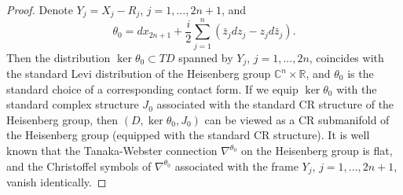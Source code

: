 \documentclass{article}
\newcommand{\CC}{\mathbb C}
\newcommand{\RR}{\mathbb R}
\begin{document}
\begin{proof}
%
Denote $Y_j = X_j - R_j$, $j = 1,...,2n+1$, and $$\theta_0 = dx_{2n+1} + \frac i 2 \sum_{j=1}^n (\bar z_j dz_j - z_j d \bar z_j).$$ Then the distribution $\ker \theta_0 \subset TD$ spanned by $Y_j$, $j = 1,...,2n$, coincides with the standard Levi distribution of the Heisenberg group $\CC^n \times \RR$, and $\theta_0$ is the standard choice of a corresponding contact form. If we equip $\ker \theta_0$ with the standard complex structure $J_{0}$ associated with the standard CR structure of the Heisenberg group, then $(D, \ker \theta_0, J_{0})$ can be viewed as a CR submanifold of the Heisenberg group (equipped with the standard CR structure). It is well known that the Tanaka-Webster connection $\nabla^{\theta_0}$ on the Heisenberg group is flat, and the Christoffel symbols of $\nabla^{\theta_0}$ associated with the frame $Y_j$, $j = 1,...,2n+1$, vanish identically.


\end{proof}
\end{document}
